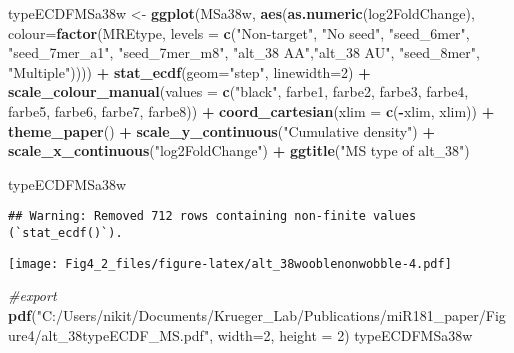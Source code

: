 \documentclass[
]{article}
\newenvironment{Shaded}{\begin{snugshade}}{\end{snugshade}}
\newcommand{\AttributeTok}[1]{\textcolor[rgb]{0.13,0.29,0.53}{#1}}
\newcommand{\CommentTok}[1]{\textcolor[rgb]{0.56,0.35,0.01}{\textit{#1}}}
\newcommand{\DecValTok}[1]{\textcolor[rgb]{0.00,0.00,0.81}{#1}}
\newcommand{\FunctionTok}[1]{\textcolor[rgb]{0.13,0.29,0.53}{\textbf{#1}}}
\newcommand{\NormalTok}[1]{#1}
\newcommand{\OtherTok}[1]{\textcolor[rgb]{0.56,0.35,0.01}{#1}}
\newcommand{\SpecialCharTok}[1]{\textcolor[rgb]{0.81,0.36,0.00}{\textbf{#1}}}
\newcommand{\StringTok}[1]{\textcolor[rgb]{0.31,0.60,0.02}{#1}}
\begin{document}
\begin{Shaded}
\begin{Highlighting}[]
\NormalTok{typeECDFMSa38w }\OtherTok{\textless{}{-}} \FunctionTok{ggplot}\NormalTok{(MSa38w, }\FunctionTok{aes}\NormalTok{(}\FunctionTok{as.numeric}\NormalTok{(log2FoldChange), }
                              \AttributeTok{colour=}\FunctionTok{factor}\NormalTok{(MREtype, }\AttributeTok{levels =} \FunctionTok{c}\NormalTok{(}\StringTok{"Non{-}target"}\NormalTok{, }\StringTok{"No seed"}\NormalTok{, }\StringTok{"seed\_6mer"}\NormalTok{, }\StringTok{"seed\_7mer\_a1"}\NormalTok{, }\StringTok{"seed\_7mer\_m8"}\NormalTok{, }\StringTok{"alt\_38 AA"}\NormalTok{,}\StringTok{"alt\_38 AU"}\NormalTok{, }\StringTok{"seed\_8mer"}\NormalTok{, }\StringTok{"Multiple"}\NormalTok{)))) }\SpecialCharTok{+} 
  \FunctionTok{stat\_ecdf}\NormalTok{(}\AttributeTok{geom=}\StringTok{"step"}\NormalTok{, }\AttributeTok{linewidth=}\DecValTok{2}\NormalTok{) }\SpecialCharTok{+}
  \FunctionTok{scale\_colour\_manual}\NormalTok{(}\AttributeTok{values =} \FunctionTok{c}\NormalTok{(}\StringTok{"black"}\NormalTok{, farbe1, farbe2, farbe3, farbe4, farbe5, farbe6, farbe7, farbe8)) }\SpecialCharTok{+}
  \FunctionTok{coord\_cartesian}\NormalTok{(}\AttributeTok{xlim =} \FunctionTok{c}\NormalTok{(}\SpecialCharTok{{-}}\NormalTok{xlim, xlim)) }\SpecialCharTok{+} 
  \FunctionTok{theme\_paper}\NormalTok{() }\SpecialCharTok{+}
  \FunctionTok{scale\_y\_continuous}\NormalTok{(}\StringTok{"Cumulative density"}\NormalTok{) }\SpecialCharTok{+} \FunctionTok{scale\_x\_continuous}\NormalTok{(}\StringTok{"log2FoldChange"}\NormalTok{) }\SpecialCharTok{+}
  \FunctionTok{ggtitle}\NormalTok{(}\StringTok{"MS type of alt\_38"}\NormalTok{)}

\NormalTok{typeECDFMSa38w}
\end{Highlighting}
\end{Shaded}

\begin{verbatim}
## Warning: Removed 712 rows containing non-finite values (`stat_ecdf()`).
\end{verbatim}

\texttt{[image: Fig4\_2\_files/figure-latex/alt\_38wooblenonwobble-4.pdf]}

\begin{Shaded}
\begin{Highlighting}[]
\CommentTok{\#export}
\FunctionTok{pdf}\NormalTok{(}\StringTok{"C:/Users/nikit/Documents/Krueger\_Lab/Publications/miR181\_paper/Figure4/alt\_38typeECDF\_MS.pdf"}\NormalTok{, }\AttributeTok{width=}\DecValTok{2}\NormalTok{, }\AttributeTok{height =} \DecValTok{2}\NormalTok{)}
\NormalTok{typeECDFMSa38w}
\end{Highlighting}
\end{Shaded}
\end{document}
